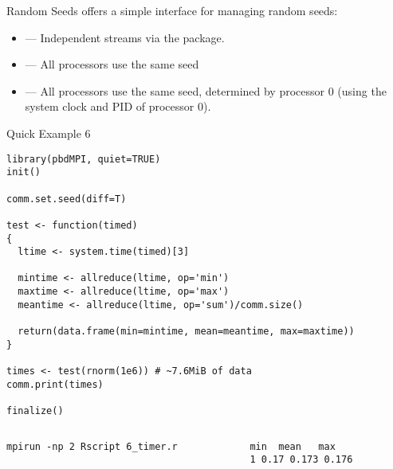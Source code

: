 \begin{frame}
  \begin{block}{Random Seeds}\pause
   offers a simple interface for managing random seeds:
    \begin{itemize}
      \item {} --- Independent streams via the  package.
      \item {} --- All processors use the same seed 
      \item {} --- All processors use the same seed, determined by 
processor 0 (using the system clock and PID of processor 0).
    \end{itemize}
  \end{block}
\end{frame}



\begin{frame}
  \begin{exampleblock}{Quick Example 6}
\begin{lstlisting}[title=Timing: 6\_timer.r]
library(pbdMPI, quiet=TRUE)
init()

comm.set.seed(diff=T)

test <- function(timed)
{
  ltime <- system.time(timed)[3]
  
  mintime <- allreduce(ltime, op='min')
  maxtime <- allreduce(ltime, op='max')
  meantime <- allreduce(ltime, op='sum')/comm.size()

  return(data.frame(min=mintime, mean=meantime, max=maxtime))
}

times <- test(rnorm(1e6)) # ~7.6MiB of data
comm.print(times)

finalize()
\end{lstlisting}
  \begin{columns}[t,onlytextwidth]
    \begin{column}{0.58\textwidth}
\begin{lstlisting}[backgroundcolor=\color{white},keywordstyle=\color{black},title=Execute this 
script via:]
mpirun -np 2 Rscript 6_timer.r
\end{lstlisting}
\end{column}
    \hfill
    \begin{column}{0.35\textwidth}
\begin{lstlisting}[title=Sample Output:]
   min  mean   max
1 0.17 0.173 0.176
\end{lstlisting}
\end{column}
\end{columns}
  \end{exampleblock}
\end{frame}



